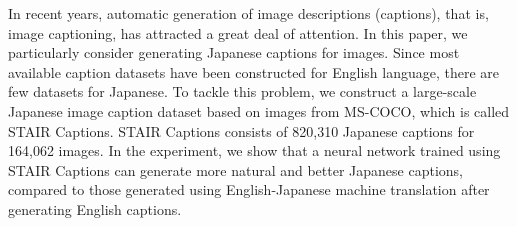 In recent years, automatic generation of image descriptions (captions), that is, image captioning, has attracted a great deal of attention. In this paper, we particularly consider generating Japanese captions for images. Since most available caption datasets have been constructed for English language, there are few datasets for Japanese. To tackle this problem, we construct a large-scale Japanese image caption dataset based on images from MS-COCO, which is called STAIR Captions. STAIR Captions consists of 820,310 Japanese captions for 164,062 images. In the experiment, we show that a neural network trained using STAIR Captions can generate more natural and better Japanese captions, compared to those generated using English-Japanese machine translation after generating English captions.

